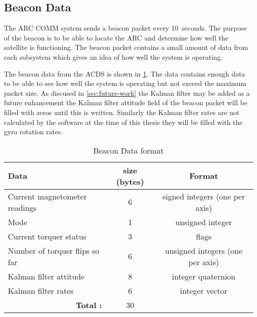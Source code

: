 \subsection{Beacon Data}

The \ac{ARC} \ac{COMM} system sends a beacon packet every 10~seconds. The purpose of the beacon is to be able to locate the \ac{ARC} and determine how well the satellite is functioning. The beacon packet contains a small amount of data from each subsystem which gives an idea of how well the system is operating.

The beacon data from the \ac{ACDS} is shown in \cref{tab:beacondat}. The data contains enough data to be able to see how well the system is operating but not exceed the maximum packet size. As discused in \cref{sec:future-work} the Kalman filter may be added as a future enhancement the Kalman filter attitude field of the beacon packet will be filled with zeros until this is written. Similarly the Kalman filter rates are not calculated by the software at the time of this thesis they will be filled with the gyro rotation rates.

\begin{table}[H]
    \centering
    \caption{Beacon Data format}
    \label{tab:beacondat}
    \begin{tabular}{|l|c|c|}
        \hline
        Data&size (bytes)&Format\\
        \hline
        Current magnetometer readings&6&signed integers (one per axis)\\
        \hline
        Mode&1&unsigned integer\\
        \hline
        Current torquer status&3&flags\\
        \hline
        Number of torquer flips so far & 6 & unsigned integers (one per axis)\\
        \hline
        Kalman filter attitude&8&integer quaternion\\
        \hline
        Kalman filter rates&6&integer vector\\
        \hline
        \multicolumn{1}{|r|}{\bfseries Total :}&30&\\
        \hline
    \end{tabular}
\end{table}

